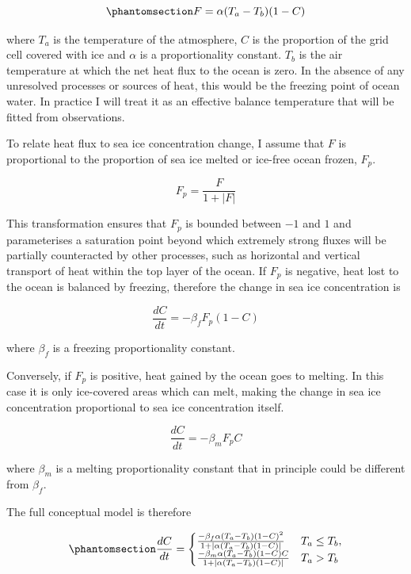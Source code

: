 \documentclass[tc, manuscript]{copernicus}
\begin{document}
\begin{equation}\protect\phantomsection\label{eq-flux}{
F = \alpha (T_a - T_b) (1 - C)
}\end{equation}

where \(T_a\) is the temperature of the atmosphere, \(C\) is the
proportion of the grid cell covered with ice and \(\alpha\) is a
proportionality constant. \(T_b\) is the air temperature at which the
net heat flux to the ocean is zero. In the absence of any unresolved
processes or sources of heat, this would be the freezing point of ocean
water. In practice I will treat it as an effective balance temperature
that will be fitted from observations.

To relate heat flux to sea ice concentration change, I assume that \(F\)
is proportional to the proportion of sea ice melted or ice-free ocean
frozen, \(F_{p}\).

\[
F_{p} = \frac{F} {1 + \left| F \right |}
\]

This transformation ensures that \(F_p\) is bounded between \(-1\) and
\(1\) and parameterises a saturation point beyond which extremely strong
fluxes will be partially counteracted by other processes, such as
horizontal and vertical transport of heat within the top layer of the
ocean. If \(F_p\) is negative, heat lost to the ocean is balanced by
freezing, therefore the change in sea ice concentration is

\[
\frac{dC}{dt} = -\beta_f F_{p} (1 - C)
\]

where \(\beta_f\) is a freezing proportionality constant.

Conversely, if \(F_p\) is positive, heat gained by the ocean goes to
melting. In this case it is only ice-covered areas which can melt,
making the change in sea ice concentration proportional to sea ice
concentration itself.

\[
\frac{dC}{dt} = -\beta_m F_{p} C
\]

where \(\beta_m\) is a melting proportionality constant that in
principle could be different from \(\beta_f\).

The full conceptual model is therefore

\begin{equation}\protect\phantomsection\label{eq-model}{
\frac{dC}{dt} =
\begin{cases}
\frac{-\beta_f \alpha (T_a - T_b) (1 - C)^2 }{ 1 + \left | \alpha (T_a - T_b) (1 - C) \right |}  &  T_a \le T_b, \\
\frac{-\beta_m \alpha (T_a - T_b) (1 - C) C }{ 1 + \left | \alpha (T_a - T_b) (1 - C) \right |}  &  T_a  > T_b
\end{cases}
}\end{equation}
\end{document}
